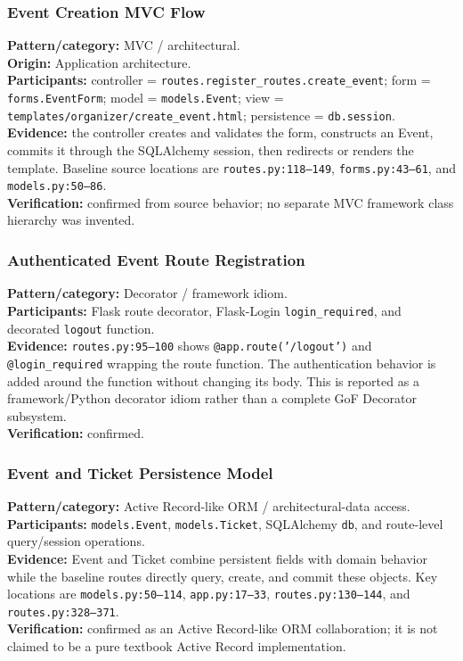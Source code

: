 \documentclass[11pt,a4paper]{article}
\begin{document}
\subsubsection{Event Creation MVC Flow}
\textbf{Pattern/category:} MVC / architectural.\\
\textbf{Origin:} Application architecture.\\
\textbf{Participants:} controller = \texttt{routes.register\_routes.create\_event}; form = \texttt{forms.EventForm}; model = \texttt{models.Event}; view = \texttt{templates/organizer/create\_event.html}; persistence = \texttt{db.session}.\\
\textbf{Evidence:} the controller creates and validates the form, constructs an Event, commits it through the SQLAlchemy session, then redirects or renders the template. Baseline source locations are \texttt{routes.py:118--149}, \texttt{forms.py:43--61}, and \texttt{models.py:50--86}.\\
\textbf{Verification:} confirmed from source behavior; no separate MVC framework class hierarchy was invented.

\subsubsection{Authenticated Event Route Registration}
\textbf{Pattern/category:} Decorator / framework idiom.\\
\textbf{Participants:} Flask route decorator, Flask-Login \texttt{login\_required}, and decorated \texttt{logout} function.\\
\textbf{Evidence:} \texttt{routes.py:95--100} shows \texttt{@app.route('/logout')} and \texttt{@login\_required} wrapping the route function. The authentication behavior is added around the function without changing its body. This is reported as a framework/Python decorator idiom rather than a complete GoF Decorator subsystem.\\
\textbf{Verification:} confirmed.

\subsubsection{Event and Ticket Persistence Model}
\textbf{Pattern/category:} Active Record-like ORM / architectural-data access.\\
\textbf{Participants:} \texttt{models.Event}, \texttt{models.Ticket}, SQLAlchemy \texttt{db}, and route-level query/session operations.\\
\textbf{Evidence:} Event and Ticket combine persistent fields with domain behavior while the baseline routes directly query, create, and commit these objects. Key locations are \texttt{models.py:50--114}, \texttt{app.py:17--33}, \texttt{routes.py:130--144}, and \texttt{routes.py:328--371}.\\
\textbf{Verification:} confirmed as an Active Record-like ORM collaboration; it is not claimed to be a pure textbook Active Record implementation.
\end{document}
